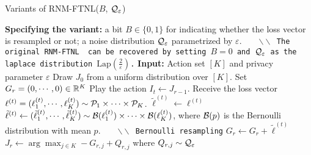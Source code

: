 \begin{algorithm}[!t]
\caption{Variants of RNM-FTNL($B$, $\mathcal{Q}_{\varepsilon}$)}
\label{alg:main}
\begin{algorithmic}[1]
\STATE \textbf{Specifying the variant:} a bit $B\in\{0, 1\}$ for indicating whether the loss vector is resampled or not; a noise distribution $\mathcal{Q}_{\varepsilon}$ parametrized by $\varepsilon$.\ \ \ \ \texttt{\small $\backslash\backslash$ The original RNM-FTNL~\citep{hu2021near} can be recovered by setting $B=0$ and $\mathcal{Q}_{\varepsilon}$ as the laplace distribution $\mathrm{Lap}(\frac{2}{\varepsilon})$.} %
\STATE \textbf{Input:} Action set $[K]$ and privacy parameter $\varepsilon$
\STATE Draw $J_{0}$ from a uniform distribution over $[K]$.
\STATE Set $G_{r} = (0, \cdots, 0)\in \mathbb{R}^{K}$
\STATE Play the action $I_t \leftarrow J_{r-1}$.
\STATE Receive the loss vector $\ell^{(t)}=(\ell^{(t)}_1, \cdots, \ell^{(t)}_K)\sim \mathcal{P}_1\times \cdots \times \mathcal{P}_K$.
\STATE $\tilde{\ell}^{(t)} \leftarrow \ell^{(t)}$
\ELSE
\STATE $\tilde{\ell}^{(t)} \leftarrow (\tilde{\ell}_{1}^{(t)}, \cdots, \tilde{\ell}_{K}^{(t)})\sim \mathcal{B}(\ell_{1}^{(t)}) \times\cdots \times \mathcal{B}(\ell_{K}^{(t)})$, where $\mathcal{B}(p)$ is the Bernoulli distribution with mean $p$.\ \ \ \ \texttt{\small $\backslash\backslash$ Bernoulli resampling}
\ENDIF
\STATE $G_{r}\leftarrow G_{r} + \tilde{\ell}^{(t)}$
\ENDFOR
\STATE $J_{r} \leftarrow \arg\max_{j\in K} -G_{r, j}  + Q_{r, j}$ where $Q_{r, j}\sim \mathcal{Q}_{\varepsilon}$
\ENDFOR
\end{algorithmic}
\end{algorithm}
